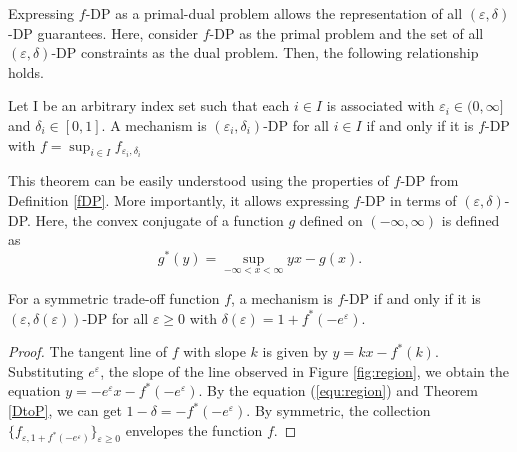 \documentclass{article}
\begin{document}
Expressing  $f$-DP as a primal-dual problem allows the representation of all $(\varepsilon, \delta)$-DP guarantees. Here, consider $f$-DP as the primal problem and the set of all $(\varepsilon, \delta)$-DP constraints as the dual problem. Then, the following relationship holds.

\begin{theorem}\label{DtoP}
    Let I be an arbitrary index set such that each $i\in I$ is associated with $\varepsilon_i \in (0,\infty]$ and $\delta_i \in [0,1]$. A mechanism is $(\varepsilon_i, \delta_i)$-DP for all $i \in I$ if and only if it is $f$-DP with $f = \sup_{i\in I} f_{\varepsilon_i,\delta_i}$
\end{theorem}
This theorem can be easily understood using the properties of  $f$-DP from Definition \ref{fDP}. More importantly, it allows expressing $f$-DP in terms of $(\varepsilon, \delta)$-DP. Here, the convex conjugate of a function $g$ defined on $(-\infty,\infty)$ is defined as 
\begin{equation}
    g^*(y) = \sup_{-\infty < x < \infty} yx - g(x).
\end{equation}

\begin{theorem}\label{PtoD}
    For a symmetric trade-off function $f$, a mechanism is $f$-DP if and only if it is $(\varepsilon,\delta(\varepsilon))$-DP for all $\varepsilon \ge 0$ with $\delta(\varepsilon) = 1 + f^*(-e^\varepsilon)$.

    \begin{proof}
        The tangent line of $f$ with slope $k$ is given by $y = kx - f^*(k)$. Substituting $e^\varepsilon$, the slope of the line observed in Figure \ref{fig:region}, we obtain the equation $y= -e^\varepsilon x - f^*(-e^\varepsilon)$. By the equation (\ref{equ:region}) and Theorem \ref{DtoP}, we can get $1-\delta = -f^*(-e^\varepsilon)$. By symmetric, the collection $\{ f_{\varepsilon,1+f^*(-e^\varepsilon)}\}_{\varepsilon \ge 0}$ envelopes the function $f$.
    \end{proof}
\end{theorem}
\end{document}
